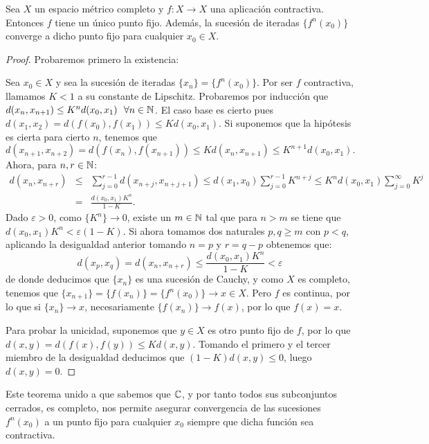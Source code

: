 \begin{teorema}
    \label{th:punto-fijo}
    Sea $X$ un espacio métrico completo y $f:X\longrightarrow X$ una aplicación contractiva. Entonces $f$ tiene un único punto fijo. Además, la sucesión de iteradas $\{f^n(x_0)\}$ converge a dicho punto fijo para cualquier $x_0\in X$. 
\end{teorema}
\begin{proof}
    Probaremos primero la existencia:

    Sea $x_0\in X$ y sea la sucesión de iteradas $\{x_n\}=\{f^n(x_0)\}$. Por ser $f$ contractiva, llamamos $K<1$ a su constante de Lipschitz. Probaremos por inducción que $d(x_n,x_{n+1})\leq K^n d(x_0,x_1) \ \ \forall n\in\mathbb{N}$.
    El caso base es cierto pues $d(x_1,x_2)=d(f(x_0),f(x_1))\leq K d(x_0,x_1)$. Si suponemos que la hipótesis es cierta para cierto $n$, tenemos que
    $$
    d(x_{n+1},x_{n+2})=d(f(x_n),f(x_{n+1}))\leq K d(x_n,x_{n+1})\leq K^{n+1}d(x_0,x_1).
    $$
    Ahora, para $n,r\in\mathbb{N}$:
    \begin{eqnarray*}
        d(x_n,x_{n+r}) & \leq & \sum_{j=0}^{r-1}d(x_{n+j},x_{n+j+1}) \leq d(x_1,x_0)\sum_{j=0}^{r-1}K^{n+j} \leq K^n d(x_0,x_1)\sum_{j=0}^{\infty} K^j \\
        & = & \frac{d(x_0,x_1)K^n}{1-K}.
    \end{eqnarray*}
    Dado $\varepsilon>0$, como $\{K^n\}\rightarrow 0$, existe un $m\in\mathbb{N}$ tal que para $n>m$ se tiene que $d(x_0,x_1)K^n<\varepsilon(1-K)$. Si ahora tomamos dos naturales $p,q\geq m$ con $p<q$, aplicando la desigualdad anterior tomando $n=p$ y $r=q-p$ obtenemos que:
    $$
    d(x_p,x_q) = d(x_n, x_{n+r}) \leq \frac{d(x_0,x_1)K^n}{1-K} < \varepsilon
    $$
    de donde deducimos que $\{x_n\}$ es una sucesión de Cauchy, y como $X$ es completo, tenemos que $\{x_{n+1}\}=\{f(x_n)\}=\{f^n(x_0)\}\rightarrow x\in X$. Pero $f$ es continua, por lo que si $\{x_n\}\rightarrow x$, necesariamente $\{f(x_n)\}\rightarrow f(x)$, por lo que $f(x)=x$.

    Para probar la unicidad, suponemos que $y\in X$ es otro punto fijo de $f$, por lo que $d(x,y) = d(f(x),f(y))\leq K d(x,y)$. Tomando el primero y el tercer miembro de la desigualdad deducimos que $(1-K)d(x,y)\leq 0$, luego $d(x,y)=0$.
\end{proof}

Este teorema unido a que sabemos que $\mathbb{C}$, y por tanto todos sus subconjuntos cerrados, es completo, nos permite asegurar convergencia de las sucesiones $f^n(x_0)$ a un punto fijo para cualquier $x_0$ siempre que dicha función sea contractiva.

